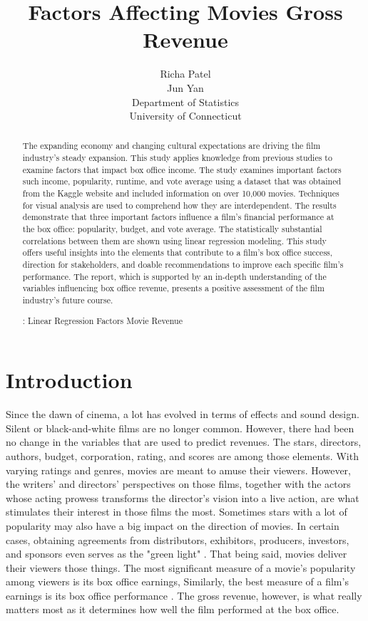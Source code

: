 \documentclass[12pt]{article}
\title{Factors Affecting Movies Gross Revenue}
\author{Richa Patel\\
  Jun Yan\\[2ex]
  Department of Statistics\\
  University of Connecticut\\
}
\begin{document}
\maketitle
\doublespace

\begin{abstract}

The expanding economy and changing cultural expectations are driving the film industry's 
steady expansion. This study applies knowledge from previous studies to examine factors 
that impact box office income. The study examines important factors such income, popularity,
runtime, and vote average using a dataset that was obtained from the Kaggle website and 
included information on over 10,000 movies. Techniques for visual analysis are used to 
comprehend how they are interdependent. The results demonstrate that three important 
factors influence a film's financial performance at the box office: popularity, budget,
and vote average. The statistically substantial correlations between them are shown using 
linear regression modeling. This study offers useful insights into the elements that 
contribute to a film's box office success, direction for stakeholders, and doable
recommendations to improve each specific film's performance. The report, which is supported 
by an in-depth understanding of the variables influencing box office revenue, presents
a positive assessment of the film industry's future course.


\bigskip
{}:
Linear Regression
Factors
Movie Revenue

\end{abstract}


\section{Introduction}
\label{sec:intro}

Since the dawn of cinema, a lot has evolved in terms of effects and sound design. 
Silent or black-and-white films are no longer common. However, there had been no
change in the variables that are used to predict revenues. The stars, directors,
authors, budget, corporation, rating, and scores are among those elements. With 
varying ratings and genres, movies are meant to amuse their viewers. However, 
the writers' and directors' perspectives on those films, together with the actors 
whose acting prowess transforms the director's vision into a live action, are what 
stimulates their interest in those films the most. Sometimes stars with a lot of 
popularity may also have a big impact on the direction of movies. In certain cases,
obtaining agreements from distributors, exhibitors, producers, investors, and sponsors 
even serves as the "green light" \citep{4}. That being said, movies deliver their 
viewers those things. The most significant measure of a movie's popularity among viewers
is its box office earnings, Similarly, the best measure of a film's earnings is its box 
office performance \citep{1}. The gross revenue, however, is what really matters most as it 
determines how well the film performed at the box office.
\end{document}

